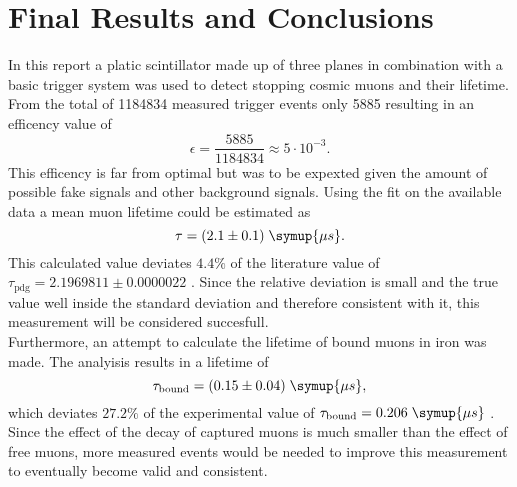 \chapter{Final Results and Conclusions}
\label{sec:results}
In this report a platic scintillator made up of three planes in combination with a basic 
trigger system was used to detect stopping cosmic muons and their lifetime. 
From the total of 1184834 measured trigger events only 5885 resulting in an efficency value of 
\begin{equation*}
    \epsilon = \frac{5885}{1184834} \approx 5 \cdot 10^{-3}.
\end{equation*}
This efficency is far from optimal but was to be expexted given the amount of possible fake signals
and other background signals. Using the fit on the available data a mean muon lifetime could be 
estimated as 
\begin{equation*}
    \tau = (2.1 \pm 0.1) \; \symup{\mu s}.
\end{equation*}
This calculated value deviates $4.4\%$ of the literature value of $\tau_{\text{pdg}} = 2.1969811 \pm 0.0000022$ \cite{pdg}.
Since the relative deviation is small and the true value well inside the 
standard deviation and therefore consistent with it, this measurement will be considered succesfull.\\
Furthermore, an attempt to calculate the lifetime of bound muons in iron was made. 
The analyisis results in a lifetime of 
\begin{equation*}
    \tau_{\text{bound}} = (0.15 \pm 0.04) \; \symup{\mu s},
\end{equation*}
which deviates $27.2\%$ of the experimental value of $\tau_{\text{bound}} = 0.206 \;\symup{\mu s}$ \cite{lvd}.
Since the effect of the decay of captured muons is much smaller than the effect of free 
muons, more measured events would be needed to improve this measurement to eventually
become valid and consistent.
